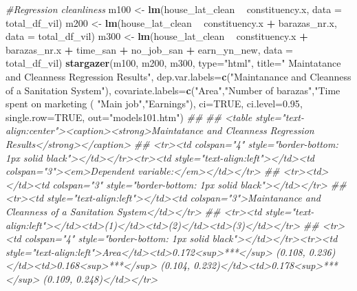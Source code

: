 \documentclass[
]{article}
\newenvironment{Shaded}{\begin{snugshade}}{\end{snugshade}}
\newcommand{\CommentTok}[1]{\textcolor[rgb]{0.56,0.35,0.01}{\textit{#1}}}
\newcommand{\DataTypeTok}[1]{\textcolor[rgb]{0.13,0.29,0.53}{#1}}
\newcommand{\FloatTok}[1]{\textcolor[rgb]{0.00,0.00,0.81}{#1}}
\newcommand{\KeywordTok}[1]{\textcolor[rgb]{0.13,0.29,0.53}{\textbf{#1}}}
\newcommand{\NormalTok}[1]{#1}
\newcommand{\OperatorTok}[1]{\textcolor[rgb]{0.81,0.36,0.00}{\textbf{#1}}}
\newcommand{\OtherTok}[1]{\textcolor[rgb]{0.56,0.35,0.01}{#1}}
\newcommand{\StringTok}[1]{\textcolor[rgb]{0.31,0.60,0.02}{#1}}
\begin{document}
\begin{Shaded}
\begin{Highlighting}[]
{{{{{{\CommentTok{#Regression cleanliness}
\NormalTok{m100 <-}\StringTok{ }\KeywordTok{lm}\NormalTok{(house_lat_clean }\OperatorTok{~}\StringTok{ }\NormalTok{constituency.x,}
           \DataTypeTok{data =}\NormalTok{ total_df_vil)}
\NormalTok{m200 <-}\StringTok{ }\KeywordTok{lm}\NormalTok{(house_lat_clean }\OperatorTok{~}\StringTok{ }\NormalTok{constituency.x }\OperatorTok{+}\StringTok{ }\NormalTok{barazas_nr.x,}
           \DataTypeTok{data =}\NormalTok{ total_df_vil)}
\NormalTok{m300 <-}\StringTok{ }\KeywordTok{lm}\NormalTok{(house_lat_clean }\OperatorTok{~}\StringTok{ }\NormalTok{constituency.x }\OperatorTok{+}\StringTok{ }\NormalTok{barazas_nr.x }\OperatorTok{+}\StringTok{ }\NormalTok{time_san }\OperatorTok{+}\StringTok{ }\NormalTok{no_job_san }\OperatorTok{+}\StringTok{ }\NormalTok{earn_yn_new,}
           \DataTypeTok{data =}\NormalTok{ total_df_vil)}
\KeywordTok{stargazer}\NormalTok{(m100, m200, m300, }\DataTypeTok{type=}\StringTok{"html"}\NormalTok{, }\DataTypeTok{title=}\StringTok{" Maintatance and Cleanness Regression Results"}\NormalTok{,}
          \DataTypeTok{dep.var.labels=}\KeywordTok{c}\NormalTok{(}\StringTok{"Maintanance and Cleanness of a Sanitation System"}\NormalTok{),}
          \DataTypeTok{covariate.labels=}\KeywordTok{c}\NormalTok{(}\StringTok{"Area"}\NormalTok{,}\StringTok{"Number of barazas"}\NormalTok{,}\StringTok{"Time spent on marketing (%) "}\NormalTok{,}
                             \StringTok{"Main job"}\NormalTok{,}\StringTok{"Earnings"}\NormalTok{), }
          \DataTypeTok{ci=}\OtherTok{TRUE}\NormalTok{, }\DataTypeTok{ci.level=}\FloatTok{0.95}\NormalTok{, }\DataTypeTok{single.row=}\OtherTok{TRUE}\NormalTok{,}
          \DataTypeTok{out=}\StringTok{"models101.htm"}\NormalTok{)}
\CommentTok{## }
\CommentTok{## <table style="text-align:center"><caption><strong>Maintatance and Cleanness Regression Results</strong></caption>}
\CommentTok{## <tr><td colspan="4" style="border-bottom: 1px solid black"></td></tr><tr><td style="text-align:left"></td><td colspan="3"><em>Dependent variable:</em></td></tr>}
\CommentTok{## <tr><td></td><td colspan="3" style="border-bottom: 1px solid black"></td></tr>}
\CommentTok{## <tr><td style="text-align:left"></td><td colspan="3">Maintanance and Cleanness of a Sanitation System</td></tr>}
\CommentTok{## <tr><td style="text-align:left"></td><td>(1)</td><td>(2)</td><td>(3)</td></tr>}
\CommentTok{## <tr><td colspan="4" style="border-bottom: 1px solid black"></td></tr><tr><td style="text-align:left">Area</td><td>0.172<sup>***</sup> (0.108, 0.236)</td><td>0.168<sup>***</sup> (0.104, 0.232)</td><td>0.178<sup>***</sup> (0.109, 0.248)</td></tr>}
}}}}}}}
\end{Highlighting}
\end{Shaded}
\end{document}
